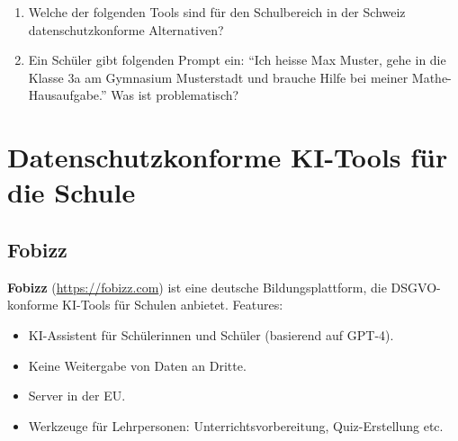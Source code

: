 \begin{myexercise}
\begin{enumerate}
\item Welche der folgenden Tools sind für den Schulbereich in der Schweiz
      datenschutzkonforme Alternativen?

\item Ein Schüler gibt folgenden Prompt ein: \enquote{Ich heisse Max Muster,
      gehe in die Klasse 3a am Gymnasium Musterstadt und brauche Hilfe bei
      meiner Mathe-Hausaufgabe.} Was ist problematisch?

\end{enumerate}
\end{myexercise}

\section{Datenschutzkonforme KI-Tools für die Schule}

\subsection{Fobizz}

\begin{myexample}
\textbf{Fobizz} (\url{https://fobizz.com}) ist eine deutsche Bildungsplattform,
die DSGVO-konforme KI-Tools für Schulen anbietet. Features:
\begin{itemize}
    \item KI-Assistent für Schülerinnen und Schüler (basierend auf GPT-4).
    \item Keine Weitergabe von Daten an Dritte.
    \item Server in der EU.
    \item Werkzeuge für Lehrpersonen: Unterrichtsvorbereitung, Quiz-Erstellung etc.
\end{itemize}
\end{myexample}

